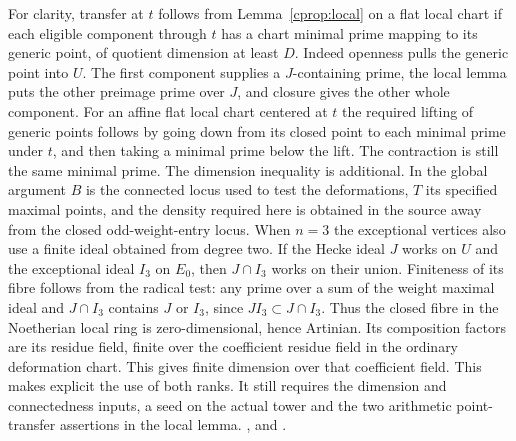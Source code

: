 For clarity, transfer at \(t\) follows from Lemma~\ref{cprop:local}
on a flat local chart if each eligible component through \(t\)
has a chart minimal prime mapping to its generic point, of quotient
dimension at least \(D\). Indeed openness pulls the generic point
into \(U\). The first component supplies a \(J\)-containing prime,
the local lemma puts the other preimage prime over \(J\), and closure
gives the other whole component. For an affine flat local chart
centered at \(t\) the required lifting of generic points follows by
going down from its closed point to each minimal prime under \(t\),
and then taking a minimal prime below the lift. The contraction is
still the same minimal prime. The dimension inequality is additional.
In the global argument \(B\) is the connected locus used to test the
deformations, \(T\) its specified maximal points, and the density
required here is obtained in the source away from the closed
odd-weight-entry locus. When \(n=3\) the exceptional vertices also
use a finite ideal obtained from degree two. If the Hecke ideal \(J\)
works on \(U\) and the exceptional ideal \(I_3\) on \(E_0\),
then \(J\cap I_3\) works on their union. Finiteness of its fibre follows
from the radical test: any prime over a sum of the weight maximal ideal
and \(J\cap I_3\) contains \(J\) or \(I_3\), since \(JI_3\subset J\cap I_3\).
Thus the closed fibre in the Noetherian local ring is zero-dimensional,
hence Artinian. Its composition factors are its residue field, finite
over the coefficient residue field in the ordinary deformation chart.
This gives finite dimension over that coefficient field.
This makes explicit the use of both ranks. It still requires the
dimension and connectedness inputs, a seed on the actual tower and
the two arithmetic point-transfer assertions in the local lemma.
,
 and
.
